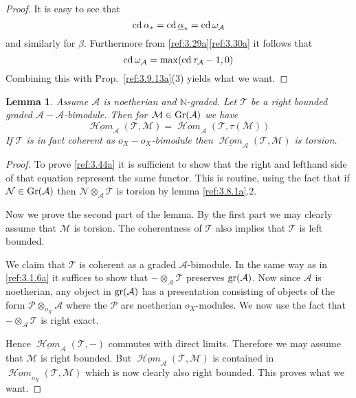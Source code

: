 \documentclass{amsproc}
\def \NN{{\mathbb N}}
\def\Ascr{{\mathcal A}}
\def\Hscr{{\mathcal H}}
\def\Mscr{{\mathcal M}}
\def\Nscr{{\mathcal N}}
\def\Pscr{{\mathcal P}}
\def\Tscr{{\mathcal T}}
\def\HHom{\operatorname {\Hscr \mathit{om}}}
\def\uHHom{\underline{\HHom}}
\def\cd{\mathop{\text{cd}}}
\def\gr{\mathop{\text{gr}}}
\def\Gr{\mathop{\text{Gr}}}
\def\gr{\operatorname {gr}}
\def\HHom{\operatorname {\Hscr \mathit{om}}}
\def\uHHom{\underline{\HHom}}
\def\gr{\operatorname {gr}}
\let\oldtext\text
\def\text#1{\oldtext{\upshape #1}}
\newtheorem{lemmas}{Lemma}[subsection]
\theoremstyle{definition}
\theoremstyle{remark}
\numberwithin{equation}{section}
\numberwithin{table}{section}
\numberwithin{figure}{section}
\def\gr{\mathop{\text{gr}}}
\def\Gr{\mathop{\text{Gr}}}
\begin{document}
\begin{proof}
It is easy to see that
\[
\cd\alpha_\ast=\cd\underline{\alpha}_\ast=\cd\omega_\Ascr
\]
and similarly for $\beta$. Furthermore from \eqref{ref:3.29a}\eqref{ref:3.30a} it follows
that \begin{equation}
\label{ref:3.43a}
\cd\omega_\Ascr=\max(\cd\tau_\Ascr-1,0)
\end{equation}
Combining this with Prop.\ \ref{ref:3.9.13a}(3) yields what we want.
\end{proof}





\begin{lemmas} 
\label{ref:3.9.15a}
Assume $\Ascr$ is noetherian and $\NN$-graded. Let
$\Tscr$   be a right bounded graded $\Ascr-\Ascr$-bimodule. Then for
  $\Mscr\in\Gr(\Ascr)$ we have
\begin{equation}
\label{ref:3.44a}
\uHHom_\Ascr(\Tscr,\Mscr)=\uHHom_\Ascr(\Tscr,\tau(\Mscr))
\end{equation}
If   $\Tscr$ is in fact  coherent as 
$o_X-o_X$-bimodule  then $\uHHom_\Ascr(\Tscr,\Mscr)$ is torsion. 
\end{lemmas}
\begin{proof}
To prove \eqref{ref:3.44a} it is sufficient to show that the right and lefthand
side of that equation represent the same functor.
This is routine, using the fact that if $\Nscr\in \Gr(\Ascr)$ then
$\Nscr\otimes_\Ascr \Tscr$ is torsion by lemma \ref{ref:3.8.1a}.2.

Now we prove the second part of the lemma. By the first part we may
clearly assume that $\Mscr$ is torsion. The coherentness of $\Tscr$ also
implies that $\Tscr$ is left bounded.

We claim that $\Tscr$ is coherent as a graded $\Ascr$-bimodule. In the
same way as in \ref{ref:3.1.6a}   it suffices to show that
$-\otimes_\Ascr\Tscr$ preserves $\gr(\Ascr)$.  Now since $\Ascr$ is
noetherian, any object in $\gr(\Ascr)$ has a presentation consisting
of objects of the form $\Pscr\otimes_{o_X}\Ascr$ where the $\Pscr$ are
noetherian $o_X$-modules. We now use the fact that
$-\otimes_\Ascr\Tscr$ is right exact.

Hence $\uHHom_\Ascr(\Tscr,-)$ commutes with direct limits. Therefore we 
may assume that $\Mscr$ is  right bounded. 
But $\uHHom_\Ascr(\Tscr,\Mscr)$ is contained  in
$\uHHom_{o_X}(\Tscr,\Mscr)$ which is now clearly also right bounded. This
proves what we want.
\end{proof}
\end{document}
